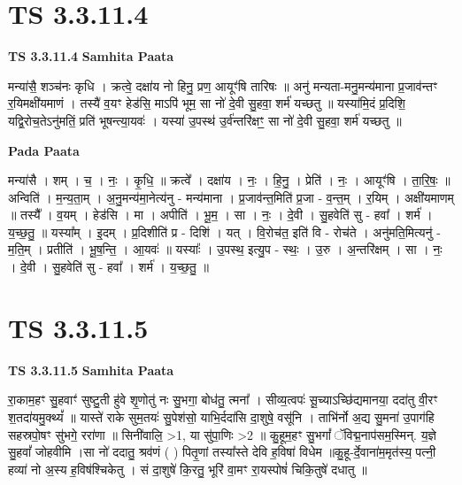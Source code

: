 \documentclass[17pt]{extarticle}
\begin{document}
\section*{ TS 3.3.11.4 }

\textbf{TS 3.3.11.4 } \newline
\textbf{Samhita Paata} \newline

मन्या॑सै॒ शञ्च॑नः कृधि । क्रत्वे॒ दक्षा॑य नो हिनु॒ प्रण॒ आयूꣳ॑षि तारिषः ॥ अनु॑ मन्यता-मनु॒मन्य॑माना प्र॒जाव॑न्तꣳ र॒यिमक्षी॑यमाणं । तस्यै॑ व॒यꣳ हेड॑सि॒ माऽपि॑ भूम॒ सा नो॑ दे॒वी सु॒हवा॒ शर्म॑ यच्छतु ॥ यस्या॑मि॒दं प्र॒दिशि॒ यद्वि॒रोच॒तेऽनु॑मतिं॒ प्रति॑ भूषन्त्या॒यवः॑ । यस्या॑ उ॒पस्थ॑ उ॒र्व॑न्तरि॑क्षꣳ॒॒ सा नो॑ दे॒वी सु॒हवा॒ शर्म॑ यच्छतु ॥ \newline

\textbf{Pada Paata} \newline

मन्या॑सै । शम् । च॒ । नः॒ । कृ॒धि॒ ॥ क्रत्वे᳚ । दक्षा॑य । नः॒ । हि॒नु॒ । प्रेति॑ । नः॒ । आयूꣳ॑षि । ता॒रि॒षः॒ ॥ अन्विति॑ । म॒न्य॒ता॒म् । अ॒नु॒मन्य॑मा॒नेत्य॑नु - मन्य॑माना । प्र॒जाव॑न्त॒मिति॑ प्र॒जा - व॒न्त॒म् । र॒यिम् । अक्षी॑यमाणम् ॥ तस्यै᳚ । व॒यम् । हेड॑सि । मा । अपीति॑ । भू॒म॒ । सा । नः॒ । दे॒वी । सु॒हवेति॑ सु - हवा᳚ । शर्म॑ । य॒च्छ॒तु॒ ॥ यस्या᳚म् । इ॒दम् । प्र॒दिशीति॑ प्र - दिशि॑ । यत् । वि॒रोच॑त॒ इति॑ वि - रोच॑ते । अनु॑मति॒मित्यनु॑ - म॒ति॒म् । प्रतीति॑ । भू॒ष॒न्ति॒ । आ॒यवः॑ ॥ यस्याः᳚ । उ॒पस्थ॒ इत्यु॒प - स्थः॒ । उ॒रु । अ॒न्तरि॑क्षम् । सा । नः॒ । दे॒वी । सु॒हवेति॑ सु - हवा᳚ । शर्म॑ । य॒च्छ॒तु॒ ॥  \newline




\section*{ TS 3.3.11.5 }

\textbf{TS 3.3.11.5 } \newline
\textbf{Samhita Paata} \newline

रा॒काम॒हꣳ सु॒हवाꣳ॑ सुष्टु॒ती हु॑वे शृ॒णोतु॑ नः सु॒भगा॒ बोध॑तु॒ त्मना᳚ । सीव्य॒त्वपः॑ सू॒च्याऽच्छि॑द्यमानया॒ ददा॑तु वी॒रꣳ श॒तदा॑यमु॒क्थ्यं᳚ ॥ यास्ते॑ राके सुम॒तयः॑ सु॒पेश॑सो॒ याभि॒र्ददा॑सि दा॒शुषे॒ वसू॑नि । ताभि॑र्नो अ॒द्य सु॒मना॑ उ॒पाग॑हि सहस्रपो॒षꣳ सु॑भगे॒ ररा॑णा ॥ सिनी॑वालि॒ >1, या सु॑पा॒णिः >2 ॥ कु॒हूम॒हꣳ सु॒भगां᳚ ॅविद्म॒नाप॑सम॒स्मिन्. य॒ज्ञे सु॒हवां᳚ जोहवीमि ।सा नो॑ ददातु॒ श्रव॑णं ( ) पितृ॒णां तस्या᳚स्ते देवि ह॒विषा॑ विधेम ॥कु॒हू-र्दे॒वाना॑म॒मृत॑स्य॒ पत्नी॒ हव्या॑ नो अ॒स्य ह॒विष॑श्चिकेतु । सं दा॒शुषे॑ कि॒रतु॒ भूरि॑ वा॒मꣳ रा॒यस्पोषं॑ चिकि॒तुषे॑ दधातु ॥ \newline
\end{document}
